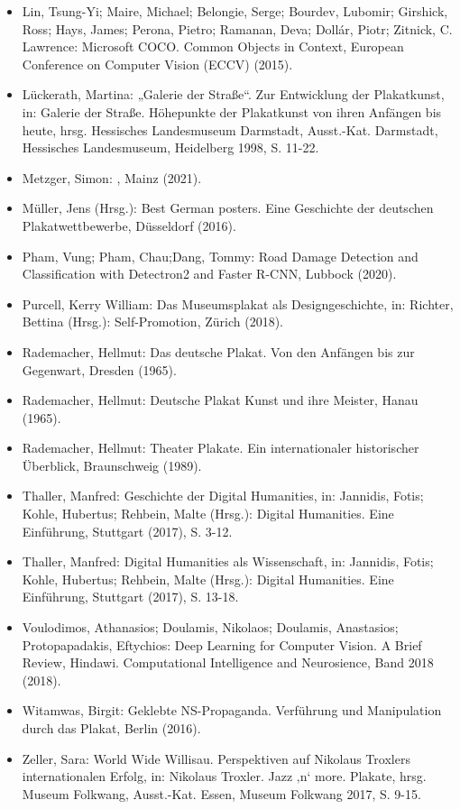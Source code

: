 \documentclass[a4paper,12pt,ngerman]{article}
\begin{document}
\begin{itemize}
	\item Lin, Tsung-Yi; Maire, Michael; Belongie, Serge; Bourdev, Lubomir; Girshick, Ross; Hays, James; Perona, Pietro; Ramanan, Deva; Dollár, Piotr; Zitnick, C. Lawrence: Microsoft COCO. Common Objects in Context, European Conference on Computer Vision (ECCV) (2015).
	\item Lückerath, Martina: „Galerie der Straße“. Zur Entwicklung der Plakatkunst, in: Galerie der Straße. Höhepunkte der Plakatkunst von ihren Anfängen bis heute, hrsg. Hessisches Landesmuseum Darmstadt, Ausst.-Kat. Darmstadt, Hessisches Landesmuseum, Heidelberg 1998, S. 11-22.
	\item Metzger, Simon: , Mainz (2021).
	\item Müller, Jens (Hrsg.): Best German posters. Eine Geschichte der deutschen Plakatwettbewerbe, Düsseldorf (2016).
	\item Pham, Vung; Pham, Chau;Dang, Tommy: Road Damage Detection and Classification with Detectron2 and Faster R-CNN, Lubbock (2020). 
	\item Purcell, Kerry William: Das Museumsplakat als Designgeschichte, in: Richter, Bettina (Hrsg.): Self-Promotion, Zürich (2018).
	\item Rademacher, Hellmut: Das deutsche Plakat. Von den Anfängen bis zur Gegenwart, Dresden (1965).
	\item Rademacher, Hellmut: Deutsche Plakat Kunst und ihre Meister, Hanau (1965).
	\item Rademacher, Hellmut: Theater Plakate. Ein internationaler historischer Überblick, Braunschweig (1989).
	\item Thaller, Manfred: Geschichte der Digital Humanities, in: Jannidis, Fotis; Kohle, Hubertus; Rehbein, Malte (Hrsg.): Digital Humanities. Eine Einführung, Stuttgart (2017), S. 3-12.
	\item Thaller, Manfred: Digital Humanities als Wissenschaft, in: Jannidis, Fotis; Kohle, Hubertus; Rehbein, Malte (Hrsg.): Digital Humanities. Eine Einführung, Stuttgart (2017), S. 13-18.
	\item Voulodimos, Athanasios; Doulamis, Nikolaos; Doulamis, Anastasios; Protopapadakis, Eftychios: Deep Learning for Computer Vision. A Brief Review, Hindawi. Computational Intelligence and Neurosience, Band 2018 (2018). 
	\item Witamwas, Birgit: Geklebte NS-Propaganda. Verführung und Manipulation durch das Plakat, Berlin (2016).
	\item Zeller, Sara: World Wide Willisau. Perspektiven auf Nikolaus Troxlers internationalen Erfolg, in: Nikolaus Troxler. Jazz ‚n‘ more. Plakate, hrsg. Museum Folkwang, Ausst.-Kat. Essen, Museum Folkwang 2017, S. 9-15.

\end{itemize}
\end{document}
